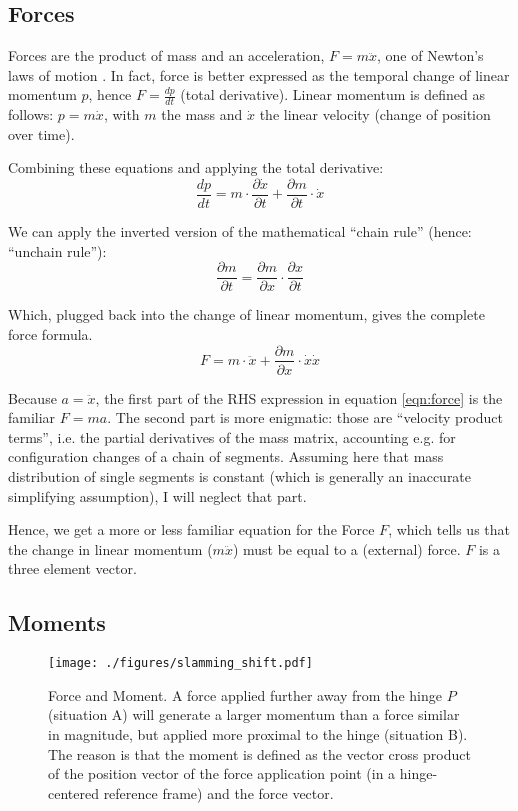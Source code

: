 \subsection{Forces}
\label{sec:orga639ae3}
Forces are the product of mass and an acceleration, \(F=m\ddot x\), one of Newton's laws of motion \citep{Newton1687,Tipler2007}.
In fact, force is better expressed as the temporal change of linear momentum \(p\), hence \(F=\frac{d p}{d t}\) (total derivative).
Linear momentum is defined as follows: \(p=m\dot x\), with \(m\) the mass and \(\dot x\) the linear velocity (change of position over time).

Combining these equations and applying the total derivative:
\[\frac{dp}{dt} = m \cdot \frac{\partial \dot x}{\partial t} + \frac{\partial m}{\partial t} \cdot \dot x\]

We can apply the inverted version of the mathematical ``chain rule'' (hence: ``unchain rule''):
\[\frac{\partial m}{\partial t} = \frac{\partial m}{\partial x} \cdot \frac{\partial x}{\partial t} \]

Which, plugged back into the change of linear momentum, gives the complete force formula.
\begin{equation}\label{eqn:force}
F = m \cdot \ddot x + \frac{\partial m}{\partial x} \cdot \dot x \dot x
\end{equation}


Because \(a=\ddot x\), the first part of the RHS expression in equation \eqref{eqn:force} is the familiar \(F=ma\).
The second part is more enigmatic: those are ``velocity product terms'', i.e. the partial derivatives of the mass matrix, accounting e.g. for configuration changes of a chain of segments.
Assuming here that mass distribution of single segments is constant (which is generally an inaccurate simplifying assumption), I will neglect that part.

Hence, we get a more or less familiar equation for the Force \(F\), which tells us that the change in linear momentum (\(m\ddot x\)) must be equal to a (external) force.
\(F\) is a three element vector.


\subsection{Moments}
\label{sec:org5af09d5}

\begin{figure}[htbp]
\centering
\texttt{[image: ./figures/slamming\_shift.pdf]}
\caption{\label{fig:slamming_moment}Force and Moment. A force applied further away from the hinge \(P\) (situation A) will generate a larger momentum than a force similar in magnitude, but applied more proximal to the hinge (situation B). The reason is that the moment is defined as the vector cross product of the position vector of the force application point (in a hinge-centered reference frame) and the force vector.}
\end{figure}

